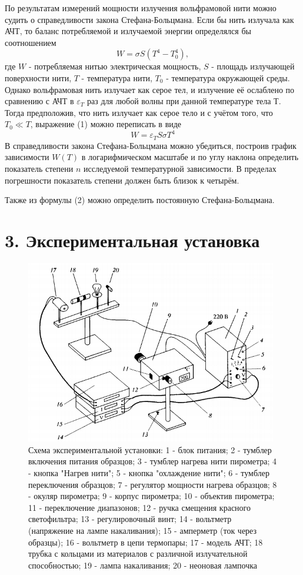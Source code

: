 \documentclass[a4paper,12pt]{report}
\begin{document}
По результатам измерений мощности излучения вольфрамовой нити можно судить о справедливости закона Стефана-Больцмана. Если бы нить излучала как АЧТ, то баланс потребляемой и излучаемой энергии определялся бы соотношением 
\begin{equation}
    W = \sigma S (T^4 - T_0^4),
\end{equation}
где $W$ - потребляемая нитью электрическая мощность, $S$ - площадь излучающей поверхности нити, $T$ - температура нити, $T_0$ - температура окружающей среды. Однако вольфрамовая нить излучает как серое тел, и излучение её ослаблено по сравнению с АЧТ в $\varepsilon_T$ раз для любой волны при данной температуре тела Т. Тогда предположив, что нить излучает как серое тело и с учётом того, что $T_0 \ll T$, выражение (1) можно переписать в виде
\begin{equation}
    W = \varepsilon_T S \sigma T^4
\end{equation}
В справедливости закона Стефана-Больцмана можно убедиться, построив график зависимости $W(T)$ в логарифмическом масштабе и по углу наклона определить показатель степени $n$ исследуемой температурной зависимости. В пределах погрешности показатель степени должен быть близок к четырём. \par
Также из формулы (2) можно определить постоянную Стефана-Больцмана.

\section*{3. Экспериментальная установка}

\begin{figure}[h]
    \centering
    \includegraphics[width=11cm]{fig1.PNG}
    \caption{Схема экспериментальной установки: 1 - блок питания; 2 - тумблер включения питания образцов; 3 - тумблер нагрева нити пирометра; 4 - кнопка "Нагрев нити"; 5 - кнопка "охлаждение нити"; 6 - тумблер переключения образцов; 7 - регулятор мощности нагрева образцов; 8 - окуляр пирометра; 9 - корпус пирометра; 10 - объектив пирометра; 11 - переключение диапазонов; 12 - ручка смещения красного светофильтра; 13 - регулировочный винт; 14 - вольтметр (напряжение на лампе накаливания); 15 - амперметр (ток через образцы); 16 - вольтметр в цепи термопары; 17 - модель АЧТ; 18 трубка с кольцами из материалов с различной излучательной способностью; 19 - лампа накаливания; 20 - неоновая лампочка}
    \label{fig:vac}
\end{figure}
\end{document}
